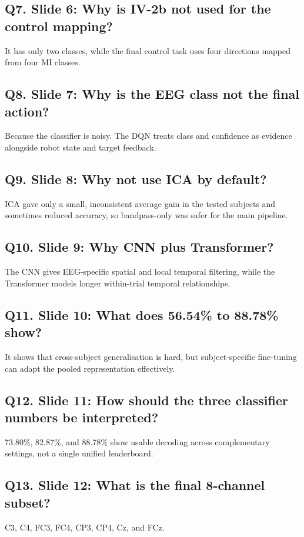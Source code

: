 \documentclass[11pt]{article}
\begin{document}
\subsection*{Q7. Slide 6: Why is IV-2b not used for the control mapping?}
It has only two classes, while the final control task uses four directions mapped from four MI classes.


\subsection*{Q8. Slide 7: Why is the EEG class not the final action?}
Because the classifier is noisy. The DQN treats class and confidence as evidence alongside robot state and target feedback.


\subsection*{Q9. Slide 8: Why not use ICA by default?}
ICA gave only a small, inconsistent average gain in the tested subjects and sometimes reduced accuracy, so bandpass-only was safer for the main pipeline.


\subsection*{Q10. Slide 9: Why CNN plus Transformer?}
The CNN gives EEG-specific spatial and local temporal filtering, while the Transformer models longer within-trial temporal relationships.


\subsection*{Q11. Slide 10: What does 56.54\% to 88.78\% show?}
It shows that cross-subject generalisation is hard, but subject-specific fine-tuning can adapt the pooled representation effectively.


\subsection*{Q12. Slide 11: How should the three classifier numbers be interpreted?}
73.80\%, 82.87\%, and 88.78\% show usable decoding across complementary settings, not a single unified leaderboard.


\subsection*{Q13. Slide 12: What is the final 8-channel subset?}
C3, C4, FC3, FC4, CP3, CP4, Cz, and FCz.
\end{document}
